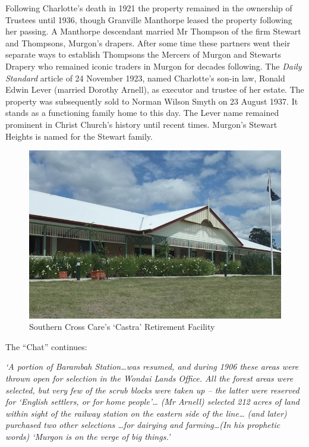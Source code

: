 Following Charlotte's death in 1921 the property remained in the ownership of Trustees until 1936, though Granville Manthorpe leased the property following her passing. A Manthorpe descendant married Mr Thompson of the firm Stewart and Thompsons, Murgon's drapers. After some time these partners went their separate ways to establish Thompsons the Mercers of Murgon and Stewarts Drapery who remained iconic traders in Murgon for decades following. The \emph{Daily Standard} article of 24 November 1923, named Charlotte's son-in law, Ronald Edwin Lever (married Dorothy Arnell), as executor and trustee of her estate. The property was subsequently sold to Norman Wilson Smyth on 23 August 1937. It stands as a functioning family home to this day. The Lever name remained prominent in Christ Church's history until recent times. Murgon's Stewart Heights is named for the Stewart family.









\begin{figure}
\begin{center}
\includegraphics[width=1.\linewidth,center]{../images/castraToday.png}
\caption{ Southern Cross Care's `Castra' Retirement Facility}
\end{center}
\end{figure}




The ``Chat'' continues:



\emph{`A portion of Barambah Station\ldots was resumed, and during 1906 these areas were thrown open for selection in the Wondai Lands Office. All the forest areas were selected, but very few of the scrub blocks were taken up -- the latter were reserved for `English settlers, or for home people'\ldots{} (Mr Arnell) selected 212 acres of land within sight of the railway station on the eastern side of the line\ldots{} (and later) purchased two other selections \ldots for dairying and farming\ldots(In his prophetic words) `Murgon is on the verge of big things.'}



